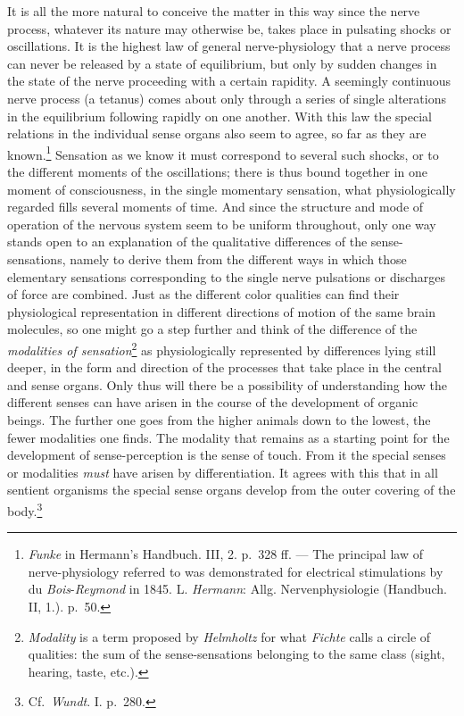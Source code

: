 \documentclass[12pt,a4paper]{book}
\newcommand{\opage}[1]{\marginnote{\footnotesize\textit{[#1]}}}
\begin{document}
It is all the more natural to conceive the matter in this way since the
nerve process, whatever its nature may otherwise be, takes place in
pulsating shocks or oscillations. It is the highest law of general
nerve-physiology that a nerve process can never be released by a state
of equilibrium, but only by sudden changes in the state of the nerve
proceeding with a certain rapidity. A seemingly continuous nerve process
(a tetanus) comes about only through a series of single alterations in
the equilibrium following rapidly on one another. With this law the
special relations in the individual sense organs also seem to agree,
so far as they are known.\footnote{\emph{Funke} in Hermann’s Handbuch.
III, 2. p.~328 ff. --- The principal law of nerve-physiology referred to
was demonstrated for electrical stimulations by du
\emph{Bois}-\emph{Reymond} in 1845. L. \emph{Hermann}: Allg.
Nervenphysiologie (Handbuch. II, 1.). p.~50.} Sensation as we know it
must correspond to several such shocks, or to the different moments of
the oscillations; there is thus bound together in one moment of
consciousness, in the single momentary sensation, what physiologically
regarded fills several moments of time. And since the structure and mode
of operation of the nervous system
\opage{127}seem to be uniform throughout, only one way stands open to an
explanation of the qualitative differences of the sense-sensations,
namely to derive them from the different ways in which those elementary
sensations corresponding to the single nerve pulsations or discharges of
force are combined. Just as the different color qualities can find their
physiological representation in different directions of motion of the
same brain molecules, so one might go a step further and think of the
difference of the \emph{modalities of
sensation}\footnote{\emph{Modality} is a term proposed by
\emph{Helmholtz} for what \emph{Fichte} calls a circle of qualities: the
sum of the sense-sensations belonging to the same class (sight, hearing,
taste, etc.).} as physiologically represented by differences lying still
deeper, in the form and direction of the processes that take place in
the central and sense organs. Only thus will there be a possibility of
understanding how the different senses can have arisen in the course of
the development of organic beings. The further one goes from the higher
animals down to the lowest, the fewer modalities one finds. The modality
that remains as a starting point for the development of sense-perception
is the sense of touch. From it the special senses or modalities
\emph{must} have arisen by differentiation. It agrees with this that in
all sentient organisms the special sense organs develop from the outer
covering of the body.\footnote{Cf.\ \emph{Wundt}. I. p.~280.}
\end{document}
